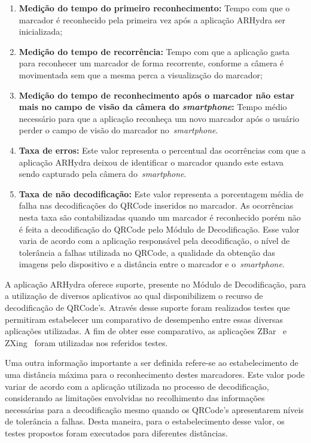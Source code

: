 	\begin{enumerate}
	  \item \textbf{Medição do tempo do primeiro reconhecimento:} Tempo com que o
	  		marcador é reconhecido pela primeira vez após a aplicação ARHydra ser inicializada;
	  
	  \item \textbf{Medição do tempo de recorrência:} Tempo com que a aplicação gasta para
	  		reconhecer um marcador de forma recorrente, conforme a câmera é movimentada sem que a mesma
	  		perca a visualização do marcador;
	  
	  \item \textbf{Medição do tempo de reconhecimento após o marcador não estar mais no campo de visão da
	  		câmera do \textit{smartphone}:} Tempo médio necessário para que a aplicação
	  		reconheça um novo marcador após o usuário perder o campo de visão do marcador
	  		no~\textit{smartphone}.
	  		
	  \item \textbf{Taxa de erros:} Este valor representa o percentual das ocorrências com que a
			aplicação ARHydra deixou de identificar o marcador quando este estava sendo capturado pela câmera
			do~\textit{smartphone}.
	   
	   \item \textbf{Taxa de não decodificação:} Este valor representa a porcentagem média de falha nas decodificações 
	   		do QRCode inseridos no marcador. As ocorrências nesta taxa são contabilizadas quando um marcador é reconhecido
	   		porém não é feita a decodificação do QRCode pelo Módulo de Decodificação. Esse valor varia de acordo 
	   		com a aplicação responsável pela decodificação, o nível de tolerância a falhas utilizada no QRCode, a 
	   		qualidade da obtenção das imagens pelo dispositivo e a distância entre o marcador e o~\textit{smartphone}. 
	
	\end{enumerate}
	
	A aplicação ARHydra oferece suporte, presente no Módulo de Decodificação, para a utilização de diversos 
	aplicativos ao qual disponibilizem o recurso de decodificação de QRCode's. Através desse suporte foram 
	realizados testes que permitiram estabelecer um comparativo de desempenho entre essas diversas aplicações 
	utilizadas. A fim de obter esse comparativo, as aplicações ZBar~\cite{zbar} e ZXing~\cite{zxing} foram	
	utilizadas nos referidos testes.
	
	Uma outra informação importante a ser definida refere-se ao estabelecimento de uma distância máxima
	para o reconhecimento destes marcadores. Este valor pode variar de acordo com a aplicação
	utilizada no processo de decodificação, considerando as limitações envolvidas no recolhimento das
	informações necessárias para a decodificação mesmo quando os QRCode's apresentarem níveis de
	tolerância a falhas. Desta maneira, para o estabelecimento desse valor, os testes propostos foram
	executados para diferentes distâncias.
	
